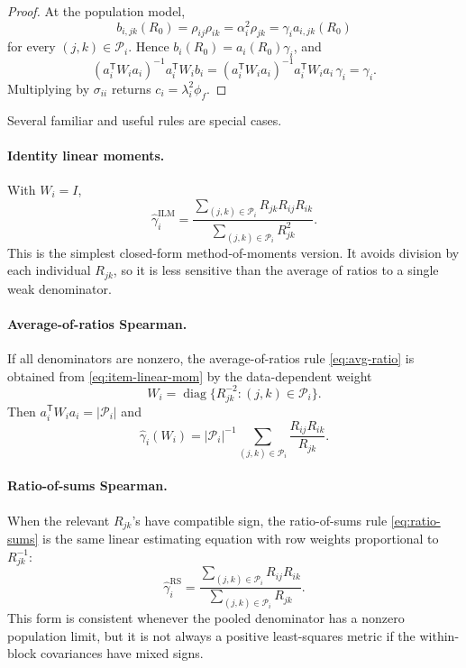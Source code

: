 \documentclass[11pt]{article}
\newcommand{\T}{^{\mathsf T}}
\newcommand{\diag}{\operatorname{diag}}
\theoremstyle{plain}
\theoremstyle{remark}
\begin{document}
\begin{proof}
At the population model,
\[
  b_{i,jk}(R_0)
  =
  \rho_{ij}\rho_{ik}
  =
  \alpha_i^2\rho_{jk}
  =
  \gamma_i a_{i,jk}(R_0)
\]
for every \((j,k)\in\mathcal P_i\). Hence \(b_i(R_0)=a_i(R_0)\gamma_i\), and
\[
  (a_i\T W_i a_i)^{-1}a_i\T W_i b_i
  =
  (a_i\T W_i a_i)^{-1}a_i\T W_i a_i\,\gamma_i
  =
  \gamma_i .
\]
Multiplying by \(\sigma_{ii}\) returns \(c_i=\lambda_i^2\phi_f\).
\end{proof}

Several familiar and useful rules are special cases.

\paragraph{Identity linear moments.}
With \(W_i=I\),
\begin{equation}\label{eq:identity-linear-mom}
  \hat\gamma_i^{\mathrm{ILM}}
  =
  \frac{\sum_{(j,k)\in\mathcal P_i}R_{jk}R_{ij}R_{ik}}
       {\sum_{(j,k)\in\mathcal P_i}R_{jk}^2}.
\end{equation}
This is the simplest closed-form method-of-moments version. It avoids division
by each individual \(R_{jk}\), so it is less sensitive than the average of
ratios to a single weak denominator.

\paragraph{Average-of-ratios Spearman.}
If all denominators are nonzero, the average-of-ratios rule
\eqref{eq:avg-ratio} is obtained from \eqref{eq:item-linear-mom} by the
data-dependent weight
\[
  W_i=\diag\{R_{jk}^{-2}:(j,k)\in\mathcal P_i\}.
\]
Then \(a_i\T W_i a_i=|\mathcal P_i|\) and
\[
  \hat\gamma_i(W_i)
  =
  |\mathcal P_i|^{-1}
  \sum_{(j,k)\in\mathcal P_i}
  \frac{R_{ij}R_{ik}}{R_{jk}} .
\]

\paragraph{Ratio-of-sums Spearman.}
When the relevant \(R_{jk}\)'s have compatible sign, the ratio-of-sums rule
\eqref{eq:ratio-sums} is the same linear estimating equation with row weights
proportional to \(R_{jk}^{-1}\):
\[
  \hat\gamma_i^{\mathrm{RS}}
  =
  \frac{\sum_{(j,k)\in\mathcal P_i}R_{ij}R_{ik}}
       {\sum_{(j,k)\in\mathcal P_i}R_{jk}} .
\]
This form is consistent whenever the pooled denominator has a nonzero
population limit, but it is not always a positive least-squares metric if the
within-block covariances have mixed signs.
\end{document}
